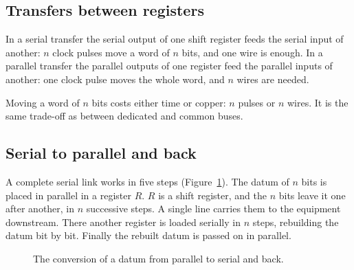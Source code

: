 \subsection{Transfers between registers}

In a serial transfer the serial output of one shift register feeds the serial
input of another: $n$ clock pulses move a word of $n$ bits, and one wire is
enough. In a parallel transfer the parallel outputs of one register feed the
parallel inputs of another: one clock pulse moves the whole word, and $n$
wires are needed.

\begin{prgconcept}
Moving a word of $n$ bits costs either time or copper: $n$ pulses or $n$
wires. It is the same trade-off as between dedicated and common buses.
\end{prgconcept}

\subsection{Serial to parallel and back}

A complete serial link works in five steps (Figure~\ref{fig:rb:serpar}). The
datum of $n$ bits is placed in parallel in a register $R$. $R$ is a shift
register, and the $n$ bits leave it one after another, in $n$ successive
steps. A single line carries them to the equipment downstream. There another
register is loaded serially in $n$ steps, rebuilding the datum bit by bit.
Finally the rebuilt datum is passed on in parallel.

\begin{figure}[htb]
\centering
{}
\caption{The conversion of a datum from parallel to serial and back.}
\label{fig:rb:serpar}
\end{figure}

